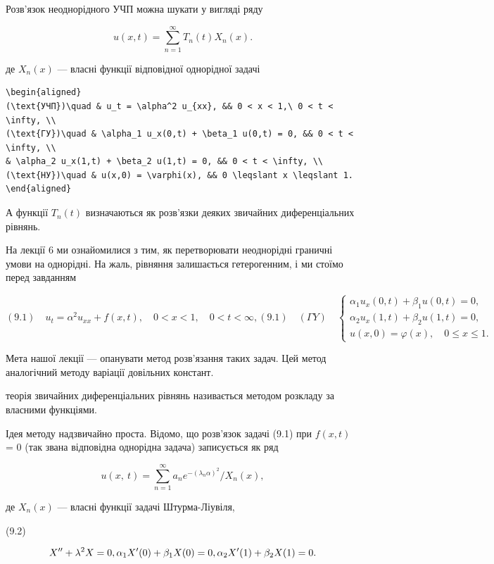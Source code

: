 \documentclass[
  ukrainian,
]{article}
\begin{document}
Розв'язок неоднорідного УЧП можна шукати у вигляді ряду

\[
u(x,t) = \sum_{n=1}^{\infty} T_n(t) X_n(x).
\]

де \(X_n(x)\) --- власні функції відповідної однорідної задачі

\begin{verbatim}
\begin{aligned}
(\text{УЧП})\quad & u_t = \alpha^2 u_{xx}, && 0 < x < 1,\ 0 < t < \infty, \\
(\text{ГУ})\quad & \alpha_1 u_x(0,t) + \beta_1 u(0,t) = 0, && 0 < t < \infty, \\
& \alpha_2 u_x(1,t) + \beta_2 u(1,t) = 0, && 0 < t < \infty, \\
(\text{НУ})\quad & u(x,0) = \varphi(x), && 0 \leqslant x \leqslant 1.
\end{aligned}
\end{verbatim}

А функції \(T_n(t)\) визначаються як розв'язки деяких звичайних
диференціальних рівнянь.

На лекції 6 ми ознайомилися з тим, як перетворювати неоднорідні граничні
умови на однорідні. На жаль, рівняння залишається гетерогенним, і ми
стоїмо перед завданням

\[
(9.1) \quad u_{t} = \alpha^{2} u_{xx} + f(x, t), \quad 0 < x < 1, \quad 0 < t < \infty,
(9.1) \quad (\Gamma Y) \quad
\begin{cases} \alpha_{1} u_{x}(0, t) + \beta_{1} u(0, t) = 0, \\ \alpha_{2} u_{x}(1, t) + \beta_{2} u(1, t) = 0, \\ u(x, 0) = \varphi(x), \quad 0 \le x \le 1. \end{cases}
\]

Мета нашої лекції --- опанувати метод розв'язання таких задач. Цей метод
аналогічний методу варіації довільних констант.

теорія звичайних диференціальних рівнянь називається методом розкладу за
власними функціями.

Ідея методу надзвичайно проста. Відомо, що розв'язок задачі (9.1) при
\(f(x, t)\) = 0 (так звана відповідна однорідна задача) записується як
ряд

\[
u\left(x,\ t\right)=\sum_{n=1}^{\infty}a_{n}e^{-\left(\lambda_{n}\alpha\right)^{2}}/X_{n}\left(x\right),
\]

де \(X_n(x)\) --- власні функції задачі Штурма-Ліувіля,

(9.2)

\[
X'' + \lambda^2 X = 0, \\ \alpha_1 X'(0) + \beta_1 X(0) = 0, \\ \alpha_2 X'(1) + \beta_2 X(1) = 0.
\]
\end{document}
